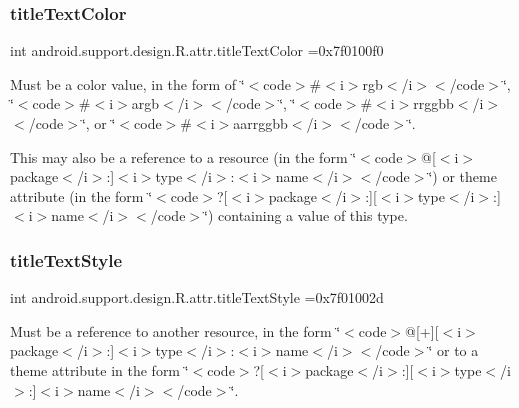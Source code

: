 \subsubsection{\texorpdfstring{title\+Text\+Color}{titleTextColor}}
{\footnotesize\ttfamily int android.\+support.\+design.\+R.\+attr.\+title\+Text\+Color =0x7f0100f0\hspace{0.3cm}{\ttfamily [static]}}

Must be a color value, in the form of \char`\"{}$<$code$>$\#$<$i$>$rgb$<$/i$>$$<$/code$>$\char`\"{}, \char`\"{}$<$code$>$\#$<$i$>$argb$<$/i$>$$<$/code$>$\char`\"{}, \char`\"{}$<$code$>$\#$<$i$>$rrggbb$<$/i$>$$<$/code$>$\char`\"{}, or \char`\"{}$<$code$>$\#$<$i$>$aarrggbb$<$/i$>$$<$/code$>$\char`\"{}. 

This may also be a reference to a resource (in the form \char`\"{}$<$code$>$@\mbox{[}$<$i$>$package$<$/i$>$\+:\mbox{]}$<$i$>$type$<$/i$>$\+:$<$i$>$name$<$/i$>$$<$/code$>$\char`\"{}) or theme attribute (in the form \char`\"{}$<$code$>$?\mbox{[}$<$i$>$package$<$/i$>$\+:\mbox{]}\mbox{[}$<$i$>$type$<$/i$>$\+:\mbox{]}$<$i$>$name$<$/i$>$$<$/code$>$\char`\"{}) containing a value of this type. \mbox{\label{classandroid_1_1support_1_1design_1_1R_1_1attr_a826c283648de1009c659c577c61a5f2f}} 
\subsubsection{\texorpdfstring{title\+Text\+Style}{titleTextStyle}}
{\footnotesize\ttfamily int android.\+support.\+design.\+R.\+attr.\+title\+Text\+Style =0x7f01002d\hspace{0.3cm}{\ttfamily [static]}}

Must be a reference to another resource, in the form \char`\"{}$<$code$>$@\mbox{[}+\mbox{]}\mbox{[}$<$i$>$package$<$/i$>$\+:\mbox{]}$<$i$>$type$<$/i$>$\+:$<$i$>$name$<$/i$>$$<$/code$>$\char`\"{} or to a theme attribute in the form \char`\"{}$<$code$>$?\mbox{[}$<$i$>$package$<$/i$>$\+:\mbox{]}\mbox{[}$<$i$>$type$<$/i$>$\+:\mbox{]}$<$i$>$name$<$/i$>$$<$/code$>$\char`\"{}. \mbox{\label{classandroid_1_1support_1_1design_1_1R_1_1attr_aac914fc3be1f5e694bde0127bf5f719b}} 
